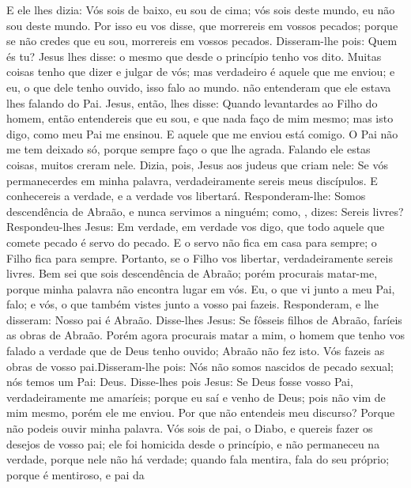 {E ele lhes dizia: Vós sois de baixo, eu sou de cima; vós sois deste mundo, eu não sou deste mundo.
Por isso eu vos disse, que morrereis em vossos pecados; porque se não credes que eu sou, morrereis em vossos pecados.
Disseram-lhe pois: Quem és tu? Jesus lhes disse:
{} o mesmo que desde o princípio tenho vos dito.
Muitas coisas tenho que dizer e julgar de vós; mas verdadeiro é aquele que me enviou; e eu, o que dele tenho ouvido, isso falo ao mundo.
 não entenderam que ele estava lhes falando do Pai.
Jesus, então, lhes disse: Quando levantardes ao Filho do homem, então entendereis que eu sou, e que nada faço de mim mesmo; mas isto digo, como meu Pai me ensinou.
E aquele que me enviou está comigo. O Pai não me tem deixado só, porque sempre faço o que lhe agrada.
Falando ele estas coisas, muitos creram nele.
Dizia, pois, Jesus aos judeus que criam nele: Se vós permanecerdes em minha palavra, verdadeiramente sereis meus discípulos.
E conhecereis a verdade, e a verdade vos libertará.
Responderam-lhe: Somos descendência
 de Abraão, e nunca servimos a ninguém; como,
{} , dizes: Sereis livres?
Respondeu-lhes Jesus: Em verdade, em verdade vos digo, que todo aquele que comete pecado é servo do pecado.
E o servo não fica em casa para sempre; o Filho fica para sempre.
Portanto, se o Filho vos libertar, verdadeiramente sereis livres.
Bem sei que sois descendência
 de Abraão; porém procurais matar-me, porque minha palavra não encontra lugar em vós.
Eu, o que vi junto a meu Pai,
{} falo; e vós, o que também vistes junto a vosso pai
{} fazeis.
Responderam, e lhe disseram: Nosso pai é Abraão. Disse-lhes Jesus: Se fôsseis filhos de Abraão, faríeis as obras de Abraão.
Porém agora procurais matar a mim, o homem que tenho vos falado a verdade que de Deus tenho ouvido; Abraão não fez isto.
Vós fazeis as obras de vosso pai.Disseram-lhe pois: Nós não somos nascidos de pecado sexual; nós temos um Pai: Deus.
Disse-lhes pois Jesus: Se Deus fosse vosso Pai, verdadeiramente me amaríeis; porque eu saí e venho de Deus; pois não vim de mim mesmo, porém ele me enviou.
Por que não entendeis meu discurso? Porque não podeis ouvir minha palavra.
Vós sois
{} de
{} pai, o Diabo, e quereis fazer os desejos de vosso pai; ele foi homicida desde o princípio, e não permaneceu na verdade, porque nele não há verdade; quando fala mentira, fala do seu próprio; porque é mentiroso, e pai da
}
